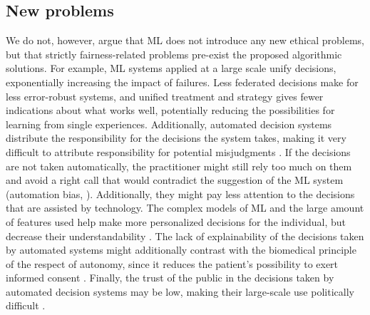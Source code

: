 \subsection{New problems}
    We do not, however, argue that ML does not introduce any new ethical problems, but that strictly fairness-related problems pre-exist the proposed algorithmic solutions.
    For example, ML systems applied at a large scale unify decisions, exponentially increasing the impact of failures.
    Less federated decisions make for less error-robust systems, and unified treatment and strategy gives fewer indications about what works well, potentially reducing the possibilities for learning from single experiences.
    Additionally, automated decision systems distribute the responsibility for the decisions the system takes, making it very difficult to attribute responsibility for potential misjudgments \cite[p.~6]{Morley2020}.
    If the decisions are not taken automatically, the practitioner might still rely too much on them and avoid a right call that would contradict the suggestion of the ML system \cite[p.~4]{Morley2020} (automation bias, \cite[p.~4]{Rajkomar2018}).
    Additionally, they might pay less attention to the decisions that are assisted by technology.
    The complex models of ML and the large amount of features used help make more personalized decisions for the individual, but decrease their understandability \cite[p.~4]{Rajkomar2018}.
    The lack of explainability of the decisions taken by automated systems might additionally contrast with the biomedical principle of the respect of autonomy, since it reduces the patient's possibility to exert informed consent \cite[p.~346]{Dijkstra2020}.
    Finally, the trust of the public in the decisions taken by automated decision systems may be low, making their large-scale use politically difficult \cite[p.~4]{Morley2020}.
